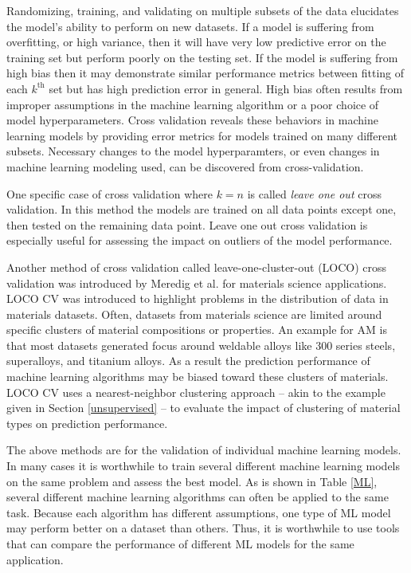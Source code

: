 Randomizing, training, and validating on multiple subsets of the data elucidates the model's ability to perform on new datasets. If a model is suffering from overfitting, or high variance, then it will have very low predictive error on the training set but perform poorly on the testing set. If the model is suffering from high bias then it may demonstrate similar performance metrics between fitting of each $k^{\text{th}}$ set but has high prediction error in general. High bias often results from improper assumptions in the machine learning algorithm or a poor choice of model hyperparameters. Cross validation reveals these behaviors in machine learning models by providing error metrics for models trained on many different subsets. Necessary changes to the model hyperparamters, or even changes in machine learning modeling used, can be discovered from cross-validation.

One specific case of cross validation where $k=n$ is called \textit{leave one out} cross validation. In this method the models are trained on all data points except one, then tested on the remaining data point. Leave one out cross validation is especially useful for assessing the impact on outliers of the model performance. 

Another method of cross validation called leave-one-cluster-out (LOCO) cross validation was introduced by Meredig et al. \cite{Meredig2018} for materials science applications. LOCO CV was introduced to highlight problems in the distribution of data in materials datasets. Often, datasets from materials science are limited around specific clusters of material compositions or properties. An example for AM is that most datasets generated focus around weldable alloys like 300 series steels, superalloys, and titanium alloys. As a result the prediction performance of machine learning algorithms may be biased toward these clusters of materials. LOCO CV uses a nearest-neighbor clustering approach -- akin to the example given in Section \ref{unsupervised} -- to evaluate the impact of clustering of material types on prediction performance.

The above methods are for the validation of individual machine learning models. In many cases it is worthwhile to train several different machine learning models on the same problem and assess the best model. As is shown in Table \ref{ML}, several different machine learning algorithms can often be applied to the same task. Because each algorithm has different assumptions, one type of ML model may perform better on a dataset than others. Thus, it is worthwhile to use tools that can compare the performance of different ML models for the same application.

